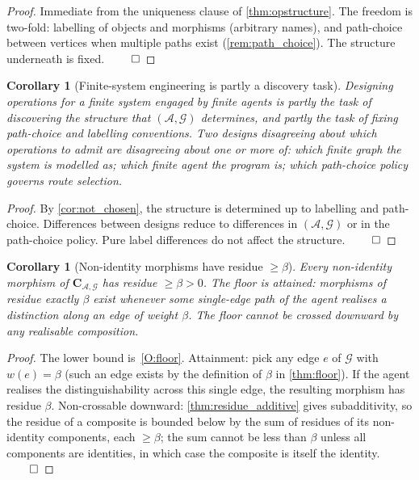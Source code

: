 \documentclass[11pt,twocolumn,a4paper]{article}
\theoremstyle{thmstyle}
\newtheorem{corollary}[theorem]{Corollary}
\theoremstyle{definition}
\theoremstyle{remark}
\newcommand{\Graph}{\mathcal{G}}
\newcommand{\Agent}{\mathcal{A}}
\newcommand{\floor}{\beta}
\begin{document}
\begin{proof}
Immediate from the uniqueness clause of \cref{thm:opstructure}.
The freedom is two-fold: labelling of objects and morphisms
(arbitrary names), and path-choice between vertices when multiple
paths exist (\cref{rem:path_choice}). The structure underneath is
fixed. $\qed$
\end{proof}

\begin{corollary}[Finite-system engineering is partly a discovery
task]
\label{cor:discovery}
Designing operations for a finite system engaged by finite agents
is partly the task of discovering the structure that
$(\Agent, \Graph)$ determines, and partly the task of fixing
path-choice and labelling conventions. Two designs disagreeing
about which operations to admit are disagreeing about one or more
of: which finite graph the system is modelled as; which finite
agent the program is; which path-choice policy governs route
selection.
\end{corollary}

\begin{proof}
By \cref{cor:not_chosen}, the structure is determined up to
labelling and path-choice. Differences between designs reduce to
differences in $(\Agent, \Graph)$ or in the path-choice policy.
Pure label differences do not affect the structure. $\qed$
\end{proof}

\begin{corollary}[Non-identity morphisms have residue
$\geq \floor$]
\label{cor:no_below}
Every non-identity morphism of $\mathbf{C}_{\Agent,\Graph}$ has
residue $\geq \floor > 0$. The floor is attained: morphisms of
residue exactly $\floor$ exist whenever some single-edge path of
the agent realises a distinction along an edge of weight $\floor$.
The floor cannot be crossed downward by any realisable composition.
\end{corollary}

\begin{proof}
The lower bound is~\ref{O:floor}. Attainment: pick any edge $e$ of
$\Graph$ with $w(e) = \floor$ (such an edge exists by the
definition of $\floor$ in \cref{thm:floor}). If the agent realises
the distinguishability across this single edge, the resulting
morphism has residue $\floor$. Non-crossable downward:
\cref{thm:residue_additive} gives subadditivity, so the residue of
a composite is bounded below by the sum of residues of its
non-identity components, each $\geq \floor$; the sum cannot be
less than $\floor$ unless all components are identities, in which
case the composite is itself the identity. $\qed$
\end{proof}
\end{document}
